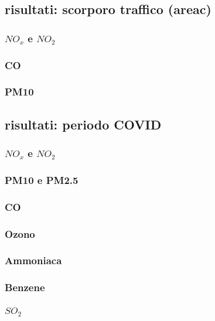 \subsection{risultati: scorporo traffico (areac)}
\subsubsection{$NO_x$ e $NO_2$}
\subsubsection{CO}
\subsubsection{PM10}



\subsection{risultati: periodo COVID}
\subsubsection{$NO_x$ e $NO_2$}
\subsubsection{PM10 e PM2.5}
\subsubsection{CO}
\subsubsection{Ozono}
\subsubsection{Ammoniaca}
\subsubsection{Benzene}
\subsubsection{$SO_2$}
